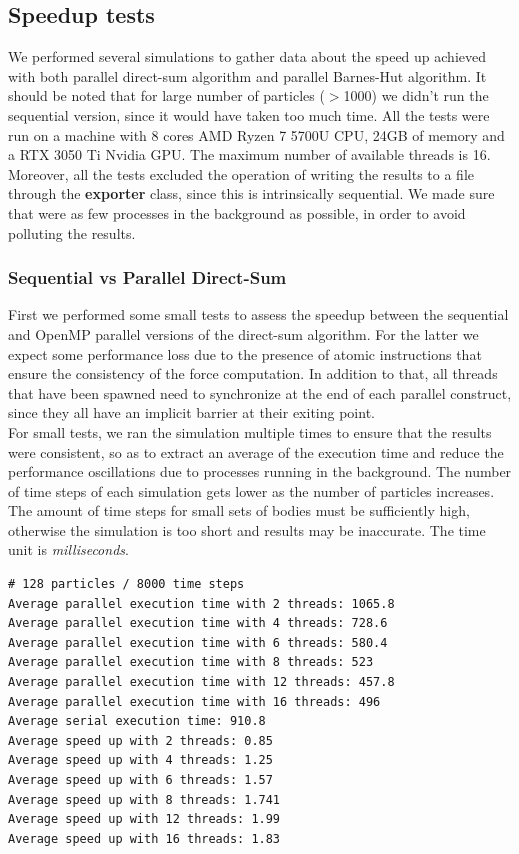 \documentclass{article}
\begin{document}
\subsection{Speedup tests}
We performed several simulations to gather data about the speed up achieved with both parallel direct-sum algorithm and parallel Barnes-Hut algorithm. It should be noted that for large number of particles ($>$1000) we didn't run the sequential version, since it would have taken too much time. 
All the tests were run on a machine with 8 cores AMD Ryzen 7 5700U CPU, 24GB of memory and a RTX 3050 Ti Nvidia GPU. The maximum number of available threads is 16.
Moreover, all the tests excluded the operation of writing the results to a file through the \textbf{exporter} class, since this is intrinsically sequential. We made sure that were as few processes in the background as possible, in order to avoid polluting the results. \\
\subsubsection{Sequential vs Parallel Direct-Sum} First we performed some small tests to assess the speedup between the sequential and OpenMP parallel versions of the direct-sum algorithm. For the latter we expect some performance loss due to the presence of atomic instructions that ensure the consistency of the force computation. In addition to that, all threads that have been spawned need to synchronize at the end of each parallel construct, since they all have an implicit barrier at their exiting point. \\
For small tests, we ran the simulation multiple times to ensure that the results were consistent, so as to extract an average of the execution time and reduce the performance oscillations due to processes running in the background. The number of time steps of each simulation gets lower as the number of particles increases. The amount of time steps for small sets of bodies must be sufficiently high, otherwise the simulation is too short and results may be inaccurate. The time unit is \textit{milliseconds}. \\

\begin{boxA}
    \begin{verbatim}
# 128 particles / 8000 time steps
Average parallel execution time with 2 threads: 1065.8 
Average parallel execution time with 4 threads: 728.6
Average parallel execution time with 6 threads: 580.4
Average parallel execution time with 8 threads: 523
Average parallel execution time with 12 threads: 457.8
Average parallel execution time with 16 threads: 496
Average serial execution time: 910.8
Average speed up with 2 threads: 0.85
Average speed up with 4 threads: 1.25
Average speed up with 6 threads: 1.57
Average speed up with 8 threads: 1.741
Average speed up with 12 threads: 1.99
Average speed up with 16 threads: 1.83
\end{verbatim}
\end{boxA}
\end{document}
